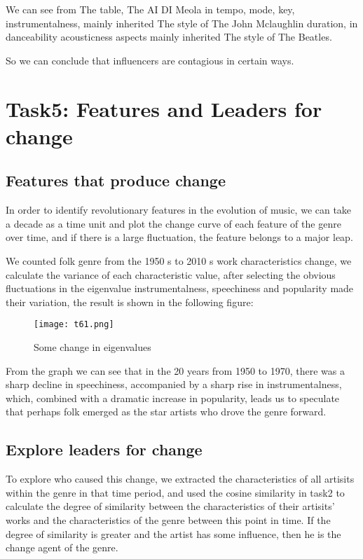 \documentclass[12pt]{article}  %
\begin{document}
We can see from The table, The AI DI Meola in tempo, mode, key, instrumentalness, mainly inherited The style of The John Mclaughlin duration, in danceability acousticness aspects mainly inherited The style of The Beatles.

So we can conclude that influencers are contagious in certain ways.

\section{Task5: Features and Leaders for change}
\subsection{Features that produce change}
In order to identify revolutionary features in the evolution of music, we can take a decade as a time unit and plot the change curve of each feature of the genre over time, and if there is a large fluctuation, the feature belongs to a major leap.

We counted folk genre from the 1950 s to 2010 s work characteristics change, we calculate the variance of each characteristic value, after selecting the obvious fluctuations in the eigenvalue instrumentalness, speechiness and popularity made their variation, the result is shown in the following figure:

\begin{figure}[H]
    \centering
    \texttt{[image: t61.png]}
    \caption{Some change in eigenvalues}
    \label{img}
\end{figure}

From the graph we can see that in the 20 years from 1950 to 1970, there was a sharp decline in speechiness, accompanied by a sharp rise in instrumentalness, which, combined with a dramatic increase in popularity, leads us to speculate that perhaps folk emerged as the star artists who drove the genre forward.

\subsection{Explore leaders for change} 

To explore who caused this change, we extracted the characteristics of all artisits within the genre in that time period, and used the cosine similarity in task2 to calculate the degree of similarity between the characteristics of their artisits' works and the characteristics of the genre between this point in time. If the degree of similarity is greater and the artist has some influence, then he is the change agent of the genre.
\end{document}
